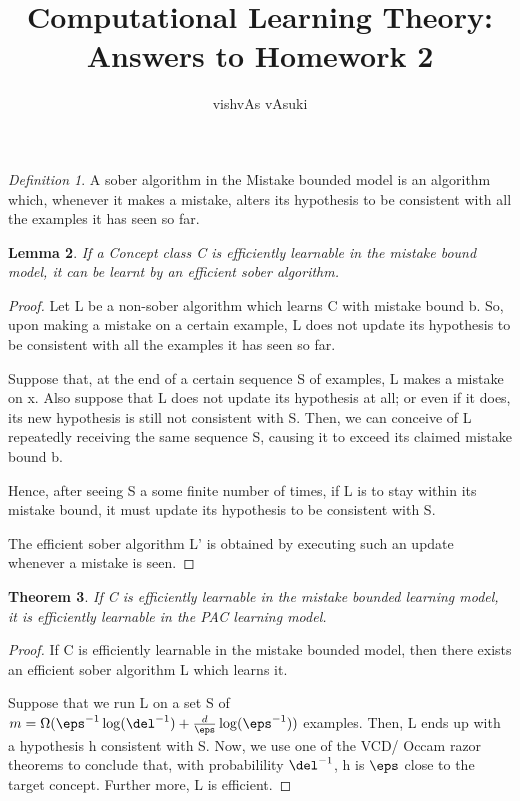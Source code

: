 \documentclass[10pt]{amsart}
\title{Computational Learning Theory: Answers to Homework 2}
\author{vishvAs vAsuki}
\newtheorem{thm}{Theorem}[subsection]
\newtheorem{lem}[thm]{Lemma}
\theoremstyle{remark}
\newtheorem{defn}[thm]{Definition}
\begin{document}
\maketitle

\section{}
\begin{defn}
A sober algorithm in the Mistake bounded model is an algorithm which, whenever it makes a mistake, alters its hypothesis to be consistent with all the examples it has seen so far.
\end{defn}

\begin{lem}
 If a Concept class C is efficiently learnable in the mistake bound model, it can be learnt by an efficient sober algorithm.
\end{lem}
\begin{proof}
 Let L be a non-sober algorithm which learns C with mistake bound b. So, upon making a mistake on a certain example, L does not update its hypothesis to be consistent with all the examples it has seen so far.

Suppose that, at the end of a certain sequence S of examples, L makes a mistake on x. Also suppose that L does not update its hypothesis at all; or even if it does, its new hypothesis is still not consistent with S. Then, we can conceive of L repeatedly receiving the same sequence S, causing it to exceed its claimed mistake bound b.

Hence, after seeing S a some finite number of times, if L is to stay within its mistake bound, it must update its hypothesis to be consistent with S.

The efficient sober algorithm L' is obtained by executing such an update whenever a mistake is seen.
\end{proof}

\begin{thm}
If C is efficiently learnable in the mistake bounded learning model, it is efficiently learnable in the PAC learning model.
\end{thm}
\begin{proof}
If C is efficiently learnable in the mistake bounded model, then there exists an efficient sober algorithm L which learns it.

Suppose that we run L on a set S of $m = \Omega(\eps^{-1}\log(\del^{-1}) + \frac{d}{\eps}\log(\eps^{-1}))$ examples. Then, L ends up with a hypothesis h consistent with S.
Now, we use one of the VCD/ Occam razor theorems to conclude that, with probabilility $\del^{-1}$, h is $\eps$ close to the target concept. Further more, L is efficient.
\end{proof}
\end{document}
